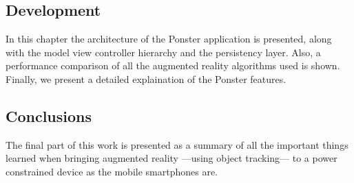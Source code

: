 \subsection*{Development}
In this chapter the architecture of the Ponster application is presented, along
with the model view controller hierarchy and the persistency layer. Also, a
performance comparison of all the augmented reality algorithms used is
shown. Finally, we present a detailed explaination of the Ponster features.

\subsection*{Conclusions}
The final part of this work is presented as a summary of all the important
things learned when bringing augmented reality ---using object tracking--- to a
power constrained device as the mobile smartphones are.
